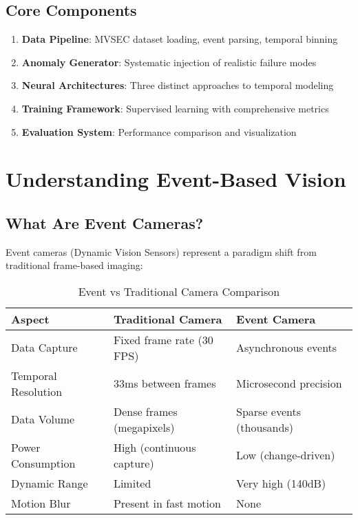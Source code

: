 \documentclass[12pt,a4paper]{article}
\begin{document}
\subsection{Core Components}

\begin{enumerate}
    \item \textbf{Data Pipeline}: MVSEC dataset loading, event parsing, temporal binning
    \item \textbf{Anomaly Generator}: Systematic injection of realistic failure modes
    \item \textbf{Neural Architectures}: Three distinct approaches to temporal modeling
    \item \textbf{Training Framework}: Supervised learning with comprehensive metrics
    \item \textbf{Evaluation System}: Performance comparison and visualization
\end{enumerate}

\section{Understanding Event-Based Vision}

\subsection{What Are Event Cameras?}

Event cameras (Dynamic Vision Sensors) represent a paradigm shift from traditional frame-based imaging:

\begin{table}[H]
\centering
\begin{tabular}{|l|l|l|}
\hline
\textbf{Aspect} & \textbf{Traditional Camera} & \textbf{Event Camera} \\
\hline
Data Capture & Fixed frame rate (30 FPS) & Asynchronous events \\
Temporal Resolution & 33ms between frames & Microsecond precision \\
Data Volume & Dense frames (megapixels) & Sparse events (thousands) \\
Power Consumption & High (continuous capture) & Low (change-driven) \\
Dynamic Range & Limited & Very high (140dB) \\
Motion Blur & Present in fast motion & None \\
\hline
\end{tabular}
\caption{Event vs Traditional Camera Comparison}
\end{table}
\end{document}
